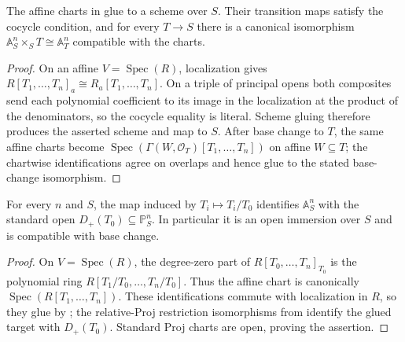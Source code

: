 \begin{lemma}
  \label{lemma:nagata-relative-affine-space-charts}

  The affine charts in  glue to a
  scheme over $S$.  Their transition maps satisfy the cocycle condition,
  and for every $T\to S$ there is a canonical isomorphism
  $\mathbb A^n_S\times_ST\cong\mathbb A^n_T$ compatible with the charts.
\end{lemma}

\begin{proof}
  On an affine $V=\operatorname{Spec}(R)$, localization gives
  $R[T_1,\ldots,T_n]_a\cong R_a[T_1,\ldots,T_n]$.  On a triple of principal
  opens both composites send each polynomial coefficient to its image in the
  localization at the product of the denominators, so the cocycle equality is
  literal.  Scheme gluing therefore produces the asserted scheme and map to
  $S$.  After base change to $T$, the same affine charts become
  $\operatorname{Spec}(\Gamma(W,\mathcal O_T)[T_1,\ldots,T_n])$ on affine
  $W\subseteq T$; the chartwise identifications agree on overlaps and hence
  glue to the stated base-change isomorphism.
\end{proof}

\begin{lemma}
  \label{lemma:nagata-relative-affine-space-open-immersion}
  \leanok

  For every $n$ and $S$, the map induced by
  $T_i\mapsto T_i/T_0$ identifies $\mathbb A^n_S$ with the standard open
  $D_+(T_0)\subseteq\mathbb P^n_S$.  In particular it is an open immersion
  over $S$ and is compatible with base change.
\end{lemma}

\begin{proof}
  \leanok
  On $V=\operatorname{Spec}(R)$, the degree-zero part of
  $R[T_0,\ldots,T_n]_{T_0}$ is the polynomial ring
  $R[T_1/T_0,\ldots,T_n/T_0]$.  Thus the affine chart is canonically
  $\operatorname{Spec}(R[T_1,\ldots,T_n])$.  These identifications commute
  with localization in $R$, so they glue by
  ; the relative-Proj
  restriction isomorphisms from
   identify the glued target with
  $D_+(T_0)$.  Standard Proj charts are open, proving the assertion.
\end{proof}

